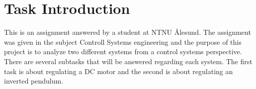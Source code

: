 \section{Task Introduction}
This is an assignment answered by a student at NTNU Ålesund. The assignment was given in the subject Controll Systems engineering and the purpose of this project is to analyze two different systems from a control systems perspective. There are several subtasks that will be answered regarding each system.
The first task is about regulating a DC motor and the second is about regulating an inverted pendulum.